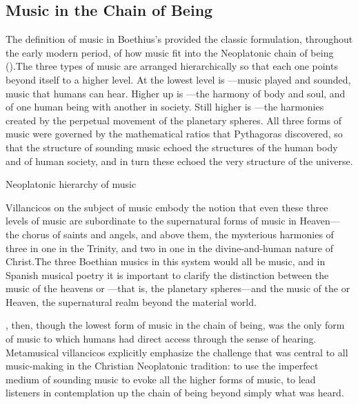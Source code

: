 
\subsection{Music in the Chain of Being}

The definition of music in Boethius's  provided the classic formulation, throughout the early modern period, of how music fit into the Neoplatonic chain of being ().
The three types of music are arranged hierarchically so that each one points beyond itself to a higher level.
At the lowest level is ---music played and sounded, music that humans can hear.
Higher up is ---the harmony of body and soul, and of one human being with another in society.
Still higher is ---the harmonies created by the perpetual movement of the planetary spheres.
All three forms of music were governed by the mathematical ratios that Pythagoras discovered, so that the structure of sounding music echoed the structures of the human body and of human society, and in turn these echoed the very structure of the universe.

\begin{table}
\caption{Neoplatonic hierarchy of music}
\label{table:Neoplatonic-hierarchy-music}
\end{table}

Villancicos on the subject of music embody the notion that even these three levels of music are subordinate to the supernatural forms of music in Heaven---the chorus of saints and angels, and above them, the mysterious harmonies of three in one in the Trinity, and two in one in the divine-and-human nature of Christ.
The three Boethian musics in this system would all be  music, and in Spanish musical poetry it is important to clarify the distinction between the music of the heavens or ---that is, the planetary spheres---and the  music of the  or Heaven, the supernatural realm beyond the material world.\citXXX[definitions]

, then, though the lowest form of music in the chain of being, was the only form of music to which humans had direct access through the sense of hearing.
Metamusical villancicos explicitly emphasize the challenge that was central to all music-making in the Christian Neoplatonic tradition: to use the imperfect medium of sounding music to evoke all the higher forms of music, to lead listeners in contemplation up the chain of being beyond simply what was heard.

